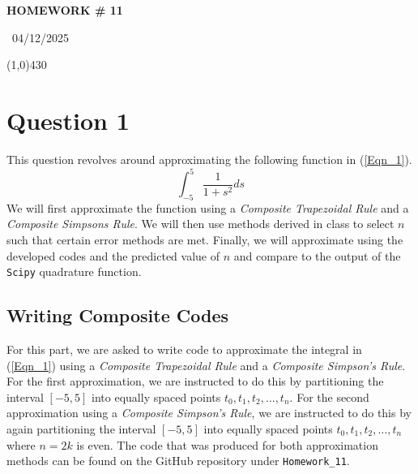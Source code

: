 \documentclass{article}
\begin{document}
\begin{center}
 \LARGE\bfseries HOMEWORK \# 11
\end{center}
\begin{center}
    ~04/12/2025~
\end{center}
 \line(1,0){430}

\section{Question 1}
This question revolves around approximating the following function in (\ref{Eqn_1}).
\begin{equation}
    \label{Eqn_1}
    \int_{-5}^5\frac{1}{1+s^2}ds
\end{equation}
We will first approximate the function using a \textit{Composite Trapezoidal Rule} and a \textit{Composite Simpsons Rule}. We will then use methods derived in class to select \(n\) such that certain error methods are met. Finally, we will approximate using the developed codes and the predicted value of \(n\) and compare to the output of the \texttt{Scipy} quadrature function.

\subsection{Writing Composite Codes}
For this part, we are asked to write code to approximate the integral in (\ref{Eqn_1}) using a \textit{Composite Trapezoidal Rule} and a \textit{Composite Simpson's Rule}. For the first approximation, we are instructed to do this by partitioning the interval \([-5,5]\) into equally spaced points \(t_0, t_1,t_2,\dots, t_n\). For the second approximation using a \textit{Composite Simpson's Rule}, we are instructed to do this by again partitioning the interval \([-5,5]\) into equally spaced points  \(t_0, t_1,t_2,\dots, t_n\) where \(n=2k\) is even. The code that was produced for both approximation methods can be found on the GitHub repository under \texttt{Homework\_11}.
\end{document}
